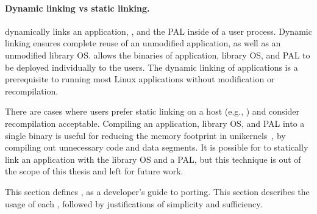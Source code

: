 \paragraph{Dynamic linking vs static linking.}
\graphene{} dynamically links an application, \libos{}, and the PAL inside of a user process.
Dynamic linking ensures complete reuse of an unmodified application,
as well as an unmodified library OS.
\graphene{} allows the binaries of application, library OS, and PAL to be deployed individually to the users.
The dynamic linking of applications is a prerequisite
to running most Linux applications without modification or recompilation.



There are cases where users prefer static linking on a host (e.g., \sgx{}) and consider recompilation acceptable.
Compiling an application, library OS, and PAL
into a single binary is useful for reducing the memory footprint in unikernels~\cite{unikernels},
by compiling out unnecessary code and data segments. 
It is possible for \graphene{} to statically link an application with the library OS and a PAL,
but this technique is out of the scope of this thesis and left for future work.



This section defines \thehostabi{},
as a developer's guide to porting. %
This section describes 
the usage of each \hostapi{},
followed by justifications of simplicity and sufficiency.


